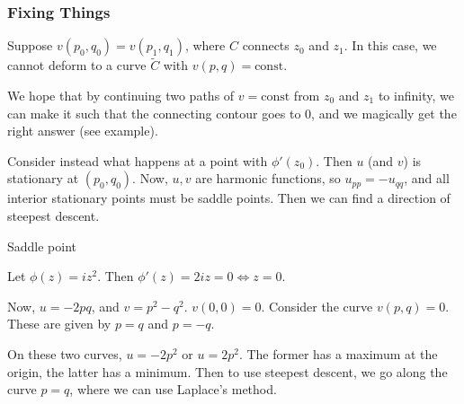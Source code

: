 \documentclass[a4paper]{article}
\begin{document}
\subsubsection*{Fixing Things}

Suppose $v(p_0, q_0) = v(p_1, q_1)$, where $C$ connects $z_0$ and $z_1$. In this case, we cannot deform to a curve $\tilde{C}$ with $v(p,q) = \text{const}$. 

\begin{idea}

We hope that by continuing two paths of $v=\text{const}$ from $z_0$ and $z_1$ to infinity, we can make it such that the connecting contour goes to 0, and we magically get the right answer (see example).
\end{idea}

Consider instead what happens at a point with $\phi'(z_0)$. Then $u$ (and $v$) is stationary at $(p_0, q_0)$. Now, $u,v$ are harmonic functions, so $u_{pp} = -u_{qq}$, and all interior stationary points must be saddle points. Then we can find a direction of steepest descent. 

\begin{eg} Saddle point

	Let $\phi(z) = iz^2$. Then $\phi'(z) = 2iz = 0 \iff z=0$.

	Now, $u = -2pq$, and $v = p^2 - q^2$.
	$v(0,0) = 0$. Consider the curve $v(p,q) = 0$. These are given by $p=q$ and $p=-q$.

	On these two curves,  $u= -2p^2$ or $u = 2p^2$. The former has a maximum at the origin, the latter has a minimum. Then to use steepest descent, we go along the curve $p=q$, where we can use Laplace's method.
\end{eg}
\end{document}
